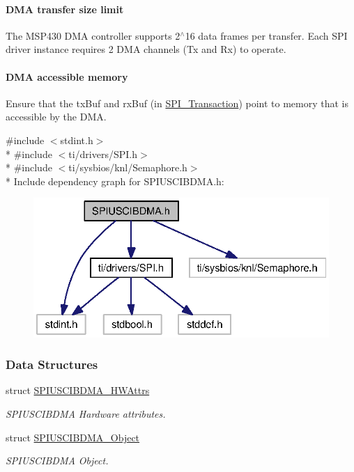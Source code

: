 \paragraph*{D\+M\+A transfer size limit}

The M\+S\+P430 D\+M\+A controller supports 2$^\wedge$16 data frames per transfer. Each S\+P\+I driver instance requires 2 D\+M\+A channels (Tx and Rx) to operate.

\paragraph*{D\+M\+A accessible memory}

Ensure that the tx\+Buf and rx\+Buf (in \hyperlink{struct_s_p_i___transaction}{S\+P\+I\+\_\+\+Transaction}) point to memory that is accessible by the D\+M\+A. 

{\ttfamily \#include $<$stdint.\+h$>$}\\*
{\ttfamily \#include $<$ti/drivers/\+S\+P\+I.\+h$>$}\\*
{\ttfamily \#include $<$ti/sysbios/knl/\+Semaphore.\+h$>$}\\*
Include dependency graph for S\+P\+I\+U\+S\+C\+I\+B\+D\+M\+A.\+h\+:
\nopagebreak
\begin{figure}[H]
\begin{center}
\leavevmode
\includegraphics[width=322pt]{_s_p_i_u_s_c_i_b_d_m_a_8h__incl}
\end{center}
\end{figure}
\subsubsection*{Data Structures}
\begin{DoxyCompactItemize}
\item 
struct \hyperlink{struct_s_p_i_u_s_c_i_b_d_m_a___h_w_attrs}{S\+P\+I\+U\+S\+C\+I\+B\+D\+M\+A\+\_\+\+H\+W\+Attrs}
\begin{DoxyCompactList}\small\item\em S\+P\+I\+U\+S\+C\+I\+B\+D\+M\+A Hardware attributes. \end{DoxyCompactList}\item 
struct \hyperlink{struct_s_p_i_u_s_c_i_b_d_m_a___object}{S\+P\+I\+U\+S\+C\+I\+B\+D\+M\+A\+\_\+\+Object}
\begin{DoxyCompactList}\small\item\em S\+P\+I\+U\+S\+C\+I\+B\+D\+M\+A Object. \end{DoxyCompactList}\end{DoxyCompactItemize}
